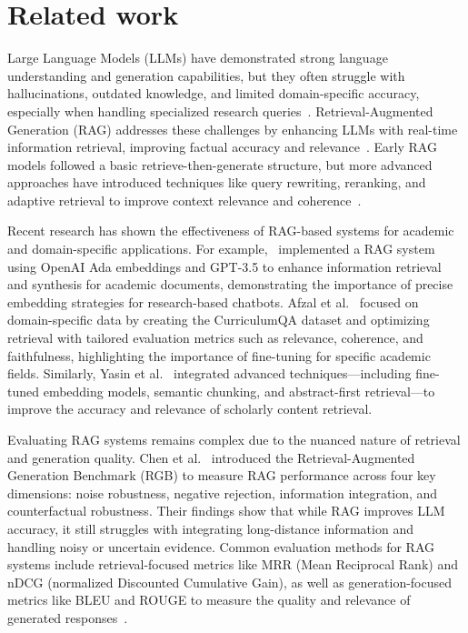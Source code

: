 \documentclass[fleqn,moreauthors,10pt]{ds_report}
\begin{document}
\section*{Related work}


Large Language Models (LLMs) have demonstrated strong language understanding and generation capabilities, but they often struggle with hallucinations, outdated knowledge, and limited domain-specific accuracy, especially when handling specialized research queries~\cite{kandpal2023longtail}. Retrieval-Augmented Generation (RAG) addresses these challenges by enhancing LLMs with real-time information retrieval, improving factual accuracy and relevance~\cite{gao2024rag}. Early RAG models followed a basic retrieve-then-generate structure, but more advanced approaches have introduced techniques like query rewriting, reranking, and adaptive retrieval to improve context relevance and coherence~\cite{gao2024rag}.

Recent research has shown the effectiveness of RAG-based systems for academic and domain-specific applications. For example,~\cite{Chatbots_in_Academia} implemented a RAG system using OpenAI Ada embeddings and GPT-3.5 to enhance information retrieval and synthesis for academic documents, demonstrating the importance of precise embedding strategies for research-based chatbots. Afzal et al.~\cite{afzal2024towards} focused on domain-specific data by creating the CurriculumQA dataset and optimizing retrieval with tailored evaluation metrics such as relevance, coherence, and faithfulness, highlighting the importance of fine-tuning for specific academic fields. Similarly, Yasin et al.~\cite{yasin2024retrieval} integrated advanced techniques—including fine-tuned embedding models, semantic chunking, and abstract-first retrieval—to improve the accuracy and relevance of scholarly content retrieval.

Evaluating RAG systems remains complex due to the nuanced nature of retrieval and generation quality. Chen et al.~\cite{chen2024benchmarking} introduced the Retrieval-Augmented Generation Benchmark (RGB) to measure RAG performance across four key dimensions: noise robustness, negative rejection, information integration, and counterfactual robustness. Their findings show that while RAG improves LLM accuracy, it still struggles with integrating long-distance information and handling noisy or uncertain evidence. Common evaluation methods for RAG systems include retrieval-focused metrics like MRR (Mean Reciprocal Rank) and nDCG (normalized Discounted Cumulative Gain), as well as generation-focused metrics like BLEU and ROUGE to measure the quality and relevance of generated responses~\cite{lewis2020rag}.
\end{document}
